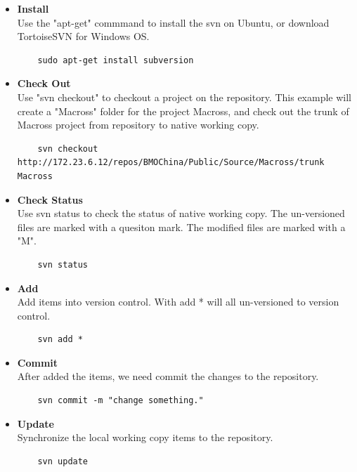 \begin{itemize}
\item
	\textbf{Install}\\
	Use the "apt-get" commmand to install the svn on Ubuntu, or download TortoiseSVN for Windows OS.
	\begin{lstlisting}
	sudo apt-get install subversion	
	\end{lstlisting}

\item
	\textbf{Check Out}\\
	Use "svn checkout" to checkout a project on the repository. This example will create a "Macross" folder for the project Macross, and check out the trunk of Macross project from repository to native working copy.
	\begin{lstlisting}
	svn checkout http://172.23.6.12/repos/BMOChina/Public/Source/Macross/trunk Macross
	\end{lstlisting}

\item
	\textbf{Check Status}\\
	Use svn status to check the status of native working copy. The un-versioned files are marked with a quesiton mark. The modified files are marked with a "M".
	\begin{lstlisting}
	svn status
	\end{lstlisting}

\item
	\textbf{Add}\\
	Add items into version control. With add * will all un-versioned to version control.
	\begin{lstlisting}
	svn add *
	\end{lstlisting}	

\item
	\textbf{Commit}\\
	After added the items, we need commit the changes to the repository.
	\begin{lstlisting}
	svn commit -m "change something."
	\end{lstlisting}

\item
	\textbf{Update}\\
	Synchronize the local working copy items to the repository.
	\begin{lstlisting}
	svn update
	\end{lstlisting}

\end{itemize}

